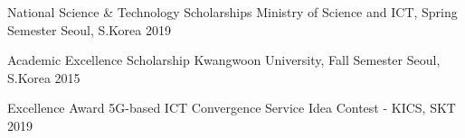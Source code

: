 


\begin{cvhonors}

  \cvhonor
    {National Science \& Technology Scholarships} %
    {Ministry of Science and ICT, Spring Semester} %
    {Seoul, S.Korea} %
    {2019} %

  \cvhonor
    {Academic Excellence Scholarship} %
    {Kwangwoon University, Fall Semester} %
    {Seoul, S.Korea} %
    {2015} %

\end{cvhonors}



\begin{cvhonors}

  \cvhonor
    {Excellence Award} %
    {5G-based ICT Convergence Service Idea Contest - KICS, SKT} %
    {} %
    {2019} %

\end{cvhonors}
